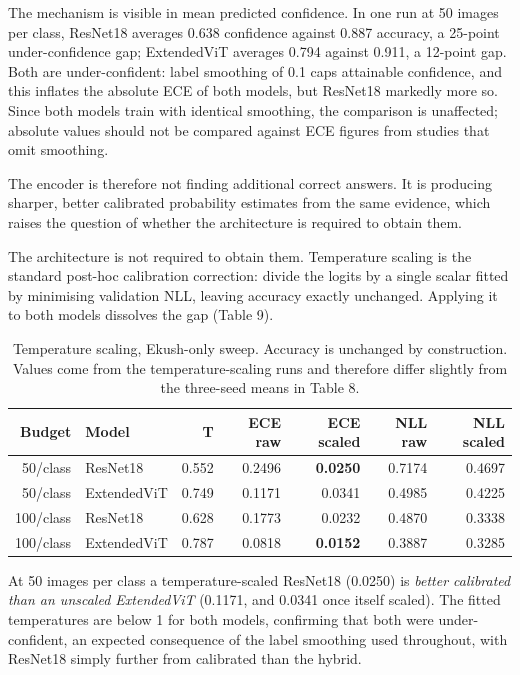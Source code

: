 The mechanism is visible in mean predicted confidence. In one run at 50 images per class, ResNet18 averages 0.638 confidence against 0.887 accuracy, a
25-point under-confidence gap; ExtendedViT averages 0.794 against 0.911,
a 12-point gap. Both are under-confident: label smoothing of 0.1 caps
attainable confidence, and this inflates the absolute ECE of both models,
but ResNet18 markedly more so. Since both models train with
identical smoothing, the comparison is unaffected; absolute values
should not be compared against ECE figures from studies that omit
smoothing.

The encoder is therefore not finding additional correct answers. It is
producing sharper, better calibrated probability estimates from the same
evidence, which raises the question of whether the architecture is
required to obtain them.

The architecture is not required to obtain them. Temperature scaling \citep{ref48} is the standard
post-hoc calibration correction: divide the logits by a single scalar
fitted by minimising validation NLL, leaving accuracy exactly unchanged.
Applying it to both models dissolves the gap (Table 9).

\begin{table}[htbp]
\centering
\footnotesize
\caption{Temperature scaling, Ekush-only sweep. Accuracy is unchanged by construction. Values come from the temperature-scaling runs and therefore differ slightly from the three-seed means in Table 8.}
\begin{tabular}{rlrrrrr}
\toprule
Budget & Model & T & ECE raw & ECE scaled & NLL raw & NLL scaled \\
\midrule
50/class & ResNet18 & 0.552 & 0.2496 & \textbf{0.0250} & 0.7174 &
0.4697 \\
50/class & Extended\-Vi\-T & 0.749 & 0.1171 & 0.0341 & 0.4985 & 0.4225 \\
100/class & ResNet18 & 0.628 & 0.1773 & 0.0232 & 0.4870 &
0.3338 \\
100/class & Extended\-Vi\-T & 0.787 & 0.0818 & \textbf{0.0152} & 0.3887 & 0.3285 \\
\bottomrule
\end{tabular}
\end{table}


At 50 images per class a temperature-scaled ResNet18 (0.0250) is
\emph{better calibrated than an unscaled ExtendedViT} (0.1171, and
0.0341 once itself scaled). The fitted temperatures are below 1 for both
models, confirming that both were under-confident, an expected
consequence of the label smoothing used throughout, with ResNet18
simply further from calibrated than the hybrid.

